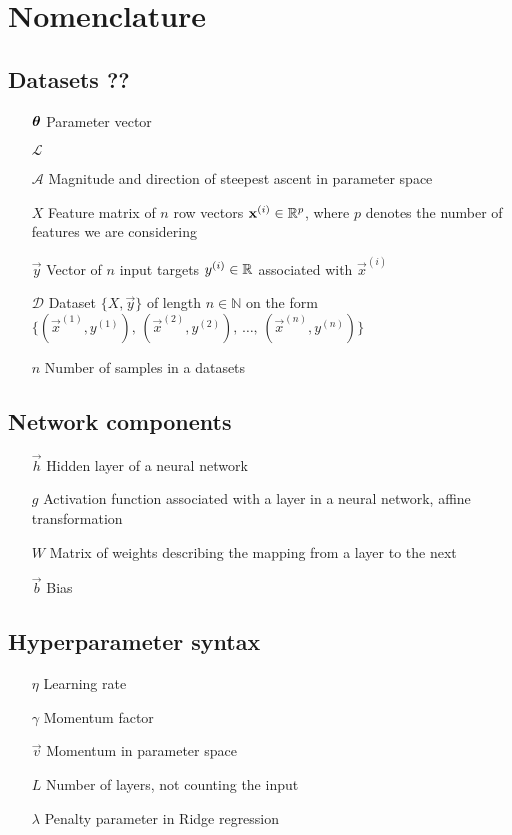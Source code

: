 \section*{Nomenclature}
\noindent\subsection{Datasets ??}
\begin{itemize}
    \item[$\svec{\theta}$] Parameter vector
    \item[$\mathcal{L}$] 
    \item[$\mathcal{A}$] Magnitude and direction of steepest ascent in parameter space
    \item[$X$] Feature matrix of $n$ row vectors $\vec{x}^{(i)} \in \RR[p]$, where $p$ denotes the number of features we are considering
    \item[$\vec{y}$] Vector of $n$ input targets $y^{(i)} \in \RR$ associated with $\vec{x}^{(i)}$
    \item[$\mathcal{D}$] Dataset $\big\{ X, \vec{y} \big\}$ of length $n\in \mathbb{N}$ on the form $\big\{(\vec{x}^{(1)}, y^{(1)}),\,(\vec{x}^{(2)}, y^{(2)}),\,\dots, \, (\vec{x}^{(n)}, y^{(n)}) \big\} $
    \item[$n$] Number of samples in a datasets  
\end{itemize}
\subsection{Network components}
\begin{itemize}
    \item[$\vec{h}$] Hidden layer of a neural network
    \item[$g$] Activation function associated with a layer in a neural network, affine transformation \checkthis{$\RR[xxx]\to\RR[yyy]$}
    \item[$W$] Matrix of weights describing the mapping from a layer to the next
    \item[$\vec{b}$] Bias 
\end{itemize}

\subsection{Hyperparameter syntax}
\begin{itemize}
    \item[$\eta$] Learning rate
    \item[$\gamma$] Momentum factor
    \item[$\vec{v}$] Momentum in parameter space  
    \item[$L$] Number of layers, not counting the input 
    \item[$\lambda$] Penalty parameter in Ridge regression 
\end{itemize}


